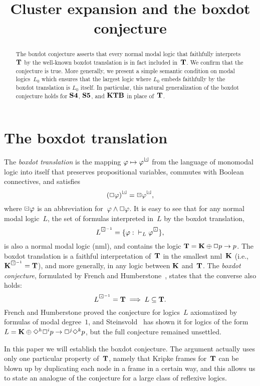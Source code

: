 \documentclass[leqno,draft,11pt]{article}
\title{Cluster expansion and the boxdot conjecture}
\def\bdi#1{#1^{\boxdot^{-1}}}
\begin{document}
\maketitle

\begin{abstract}
The boxdot conjecture asserts that every normal modal logic that
faithfully interprets~$\mathbf T$ by the well-known boxdot translation is
in fact included in~$\mathbf T$. We confirm that the conjecture is
true. More generally, we present a simple semantic condition on modal
logics~$L_0$ which ensures that the largest logic where $L_0$
embeds faithfully by the boxdot translation is $L_0$ itself. In particular, this
natural generalization of the boxdot conjecture holds for $\mathbf{S4}$,
$\mathbf{S5}$, and $\mathbf{KTB}$ in place of~$\mathbf T$.
\end{abstract}

\section{The boxdot translation}\label{sec:boxdot}
The \emph{boxdot translation} is the mapping $\fii\mapsto\fii^\boxdot$ from the
language of monomodal logic into itself that preserves
propositional variables, commutes with Boolean connectives, and
satisfies
\[(\Box\fii)^\boxdot=\boxdot\fii^\boxdot,\]
where $\boxdot\fii$ is an abbreviation for~$\varphi\land\Box\varphi$. It is
easy to see that for any normal modal logic~$L$, the set of formulas
interpreted in~$L$ by the boxdot translation,
\[\bdi L=\{\fii:{}\vdash_L\fii^\boxdot\},\]
is also a normal modal logic (nml), and contains the logic $\mathbf
T=\mathbf K\oplus\Box p\to p$. The boxdot translation is a faithful
interpretation of~$\mathbf T$ in the smallest nml~$\mathbf K$ (i.e.,
$\bdi{\lgc K}=\lgc T$), and more generally, in any logic between $\mathbf
K$ and~$\mathbf T$. The \emph{boxdot conjecture}, formulated by French and
Humberstone~\cite{fr-hum}, states that the converse also holds:
\[\bdi L=\lgc T\implies L\sset\lgc T.\]
French and Humberstone proved the conjecture for logics~$L$
axiomatized by formulas of modal degree~$1$, and
Steinsvold~\cite{steinsv} has shown it for logics of the form $L=\mathbf
K\oplus\Diamond^h\Box^ip\to\Box^j\Diamond^kp$, but the full conjecture
remained unsettled.

In this paper we will establish the boxdot conjecture. The argument
actually uses only one particular property of~$\mathbf T$, namely that
Kripke frames for~$\mathbf T$ can be blown up by duplicating each node in
a frame in a certain way, and this allows us to state an analogue of
the conjecture for a large class of reflexive logics.
\end{document}
